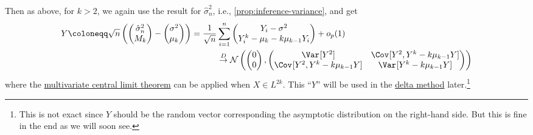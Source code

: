 Then as above, for \(k > 2\), we again use the result for \(\hat{\sigma} _n^2\), i.e., \autoref{prop:inference-variance}, and get
\[
	\begin{split}
		Y \coloneqq \sqrt{n} \left( \begin{pmatrix}
				                            \hat{\sigma} _n^2 \\
				                            M_k               \\
			                            \end{pmatrix} - \begin{pmatrix}
				                                            \sigma ^2 \\
				                                            \mu _k    \\
			                                            \end{pmatrix} \right)
		= \frac{1}{\sqrt{n} } & \sum_{i=1}^{n}  \begin{pmatrix}
			                                        Y_i - \sigma ^2                   \\
			                                        Y_i^k - \mu _k - k \mu _{k-1} Y_i \\
		                                        \end{pmatrix} + o_p(1)                                                                                                     \\
		                      & \overset{D}{\to} \mathcal{N} \left( \begin{pmatrix}
				                                                            0 \\
				                                                            0 \\
			                                                            \end{pmatrix} , \begin{pmatrix}
				                                                                            \Var_{}[Y^2]                        & \Cov_{}[Y^2 , Y^k - k \mu _{k-1} Y] \\
				                                                                            \Cov_{}[Y^2 , Y^k - k \mu _{k-1} Y] & \Var_{}[Y^k - k \mu _{k-1} Y]       \\
			                                                                            \end{pmatrix} \right)
	\end{split}
\]
where the \hyperref[thm:multivariate-CLT]{multivariate central limit theorem} can be applied when \(X \in L^{2k}\). This ``\(Y\)'' will be used in the \hyperref[thm:delta-method]{delta method} later.\footnote{This is not exact since \(Y\) should be the random vector corresponding the asymptotic distribution on the right-hand side. But this is fine in the end as we will soon see.}

